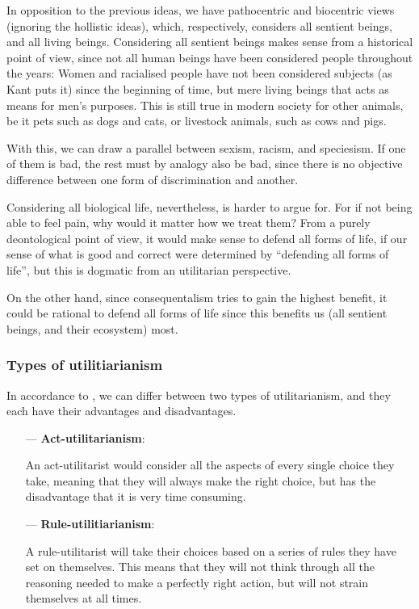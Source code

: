 \documentclass{myassignment}
\newcommand{\q}[1]{``#1''}
\begin{document}
\begin{answer}
		In opposition to the previous ideas, we have pathocentric and biocentric views (ignoring the hollistic ideas), which, respectively, considers all sentient beings, and all living beings. Considering all sentient beings makes sense from a historical point of view, since not all human beings have been considered people throughout the years: Women and racialised people have not been considered subjects (as Kant puts it) since the beginning of time, but mere living beings that acts as means for men's purposes. This is still true in modern society for other animals, be it pets such as dogs and cats, or livestock animals, such as cows and pigs. 

		With this, we can draw a parallel between sexism, racism, and speciesism. If one of them is bad, the rest must by analogy also be bad, since there is no objective difference between one form of discrimination and another. \autocite{singerequal}

		Considering all biological life, nevertheless, is harder to argue for. For if not being able to feel pain, why would it matter how we treat them? From a purely deontological point of view, it would make sense to defend all forms of life, if our sense of what is good and correct were determined by \q{defending all forms of life}, but this is dogmatic from an utilitarian perspective. 

		On the other hand, since consequentalism tries to gain the highest benefit, it could be rational to defend all forms of life since this benefits us (all sentient beings, and their ecosystem) most.

		\subsubsection*{Types of utilitiarianism} 

		In accordance to \citet{smarttypes}, we can differ between two types of utilitarianism, and they each have their advantages and disadvantages. 
		\begin{itemize}
			\item[---] \textbf{Act-utilitarianism}:

				An act-utilitarist would consider all the aspects of every single choice they take, meaning that they will always make the right choice, but has the disadvantage that it is very time consuming.

			\item[---] \textbf{Rule-utilitiarianism}:

				A rule-utilitarist will take their choices based on a series of rules they have set on themselves. This means that they will not think through all the reasoning needed to make a perfectly right action, but will not strain themselves at all times.
		\end{itemize}


\end{answer}
\end{document}

